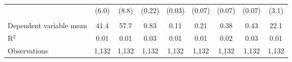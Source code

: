 \begin{adjustbox}{width = \textwidth, center}
\begin{tabular}{lcccccccc}
                              & (6.0)         & (8.8)         & (0.22)        & (0.03)       & (0.07)       & (0.07)        & (0.07)       & (3.1)\\   
       \\
      Dependent variable mean & 41.4          & 57.7          & 0.83          & 0.11         & 0.21         & 0.38          & 0.43         & 22.1\\  
      R$^2$                   & 0.01          & 0.01          & 0.03          & 0.01         & 0.01         & 0.02          & 0.03         & 0.01\\  
      Observations            & 1,132         & 1,132         & 1,132         & 1,132        & 1,132        & 1,132         & 1,132        & 1,132\\  
      \bottomrule
   \end{tabular}
\end{adjustbox}
\par\endgroup


